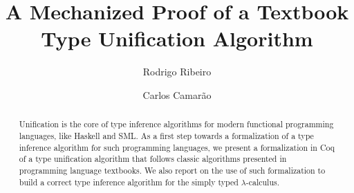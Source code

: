 \documentclass{llncs}
\begin{document}
\lstset{tabsize=3,
	    language=,
	    basicstyle=\footnotesize\ttfamily}

\mainmatter

\title{A Mechanized Proof of a Textbook\\Type Unification Algorithm}


\author{Rodrigo Ribeiro \and Carlos Camar\~ao}


\maketitle

\begin{abstract}
Unification is the core of type inference algorithms for modern
functional programming languages, like Haskell and SML. As a first
step towards a formalization of a type inference algorithm for such
programming languages, we present a formalization in Coq of a type
unification algorithm that follows classic algorithms presented in
programming language textbooks. We also report on the use of such
formalization to build a correct type inference algorithm for the
simply typed $\lambda$-calculus.
\end{abstract}

\newcommand{\defas}{\ensuremath{\overset{def}{=}}}
\newcommand{\fv}{\ensuremath{\text{FV}}}
\newcommand{\fvc}{\ensuremath{\text{FVC}}}
\newcommand{\eeq}{\ensuremath{\overset{e}{=}}}
\newcommand{\append}{\ensuremath{\texttt{ ++ }}}
\newcommand{\V}{\ensuremath{\mathcal{V}}}
\newcommand{\C}{\ensuremath{\mathbb{C}}}
\newcommand{\wf}{\ensuremath{\text{\it wf\/}}}
\newcommand{\If}{\ensuremath{\text{if }}}
\newcommand{\Let}{\ensuremath{\text{let }}}
\newcommand{\In}{\ensuremath{\text{in }}}
\newcommand{\Then}{\ensuremath{\text{ then }}}
\newcommand{\Else}{\ensuremath{\text{ else }}}
\newcommand{\fail}{\ensuremath{\text{fail}}}
\newcommand{\unify}{\ensuremath{\text{\it unify\/}}}
\newcommand{\Occurs}{\ensuremath{\text{\it ocurrs\/}}}
\newcommand{\dom}{\ensuremath{\text{\it dom\/}}}
\newcommand{\size}{\ensuremath{\text{\it size\/}}}
\newcommand{\unifier}{\ensuremath{\text{\it unifier\/}}}
\newcommand{\True}{\ensuremath{\text{\tt True}}}
\newcommand{\False}{\ensuremath{\text{\tt False}}}
\newtheorem{Lemma}{Lemma}
\newtheorem{Theorem}{Theorem}
\newtheorem{Corollary}{Corollary}
\newtheorem{Definition}{Definition}
\newtheorem{Notation}{Notation Conventions}
\newcommand{\ccite}[1]{\cite{#1}}













\end{document}
